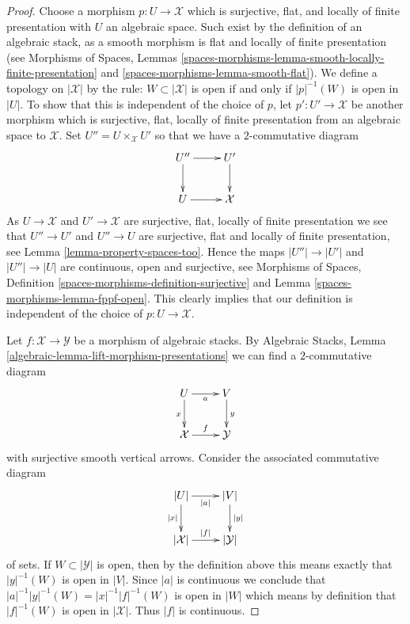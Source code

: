 \documentclass[10pt,a4paper]{amsart}
\theoremstyle{plain}
\theoremstyle{definition}
\theoremstyle{remark}
\numberwithin{equation}{subsection}
\begin{document}
\begin{proof}
Choose a morphism $p : U \to \mathcal{X}$ which is
surjective, flat, and locally of finite presentation
with $U$ an algebraic space. Such exist by the definition of an algebraic
stack, as a smooth morphism is flat and locally of finite presentation
(see
Morphisms of Spaces,
Lemmas \ref{spaces-morphisms-lemma-smooth-locally-finite-presentation} and
\ref{spaces-morphisms-lemma-smooth-flat}).
We define a topology on $|\mathcal{X}|$ by the rule:
$W \subset |\mathcal{X}|$ is open if and only if $|p|^{-1}(W)$ is open
in $|U|$. To show that this is independent of the choice of $p$, let
$p' : U' \to \mathcal{X}$ be another morphism which is surjective, flat,
locally of finite presentation from an algebraic space to
$\mathcal{X}$. Set $U'' = U \times_\mathcal{X} U'$
so that we have a $2$-commutative diagram
$$
\xymatrix{
U'' \ar[r] \ar[d] & U' \ar[d] \\
U \ar[r] & \mathcal{X}
}
$$
As $U \to \mathcal{X}$ and $U' \to \mathcal{X}$ are surjective, flat,
locally of finite presentation we see that $U'' \to U'$ and $U'' \to U$
are surjective, flat and locally of finite presentation, see
Lemma \ref{lemma-property-spaces-too}.
Hence the maps $|U''| \to |U'|$ and $|U''| \to |U|$ are continuous, open
and surjective, see
Morphisms of Spaces,
Definition \ref{spaces-morphisms-definition-surjective} and
Lemma \ref{spaces-morphisms-lemma-fppf-open}.
This clearly implies that our definition is independent of the choice
of $p : U \to \mathcal{X}$.

\medskip\noindent
Let $f : \mathcal{X} \to \mathcal{Y}$ be a morphism of algebraic stacks.
By
Algebraic Stacks, Lemma \ref{algebraic-lemma-lift-morphism-presentations}
we can find a $2$-commutative diagram
$$
\xymatrix{
U \ar[d]_x \ar[r]_a & V \ar[d]^y \\
\mathcal{X} \ar[r]^f & \mathcal{Y}
}
$$
with surjective smooth vertical arrows.
Consider the associated commutative diagram
$$
\xymatrix{
|U| \ar[d]_{|x|} \ar[r]_{|a|} & |V| \ar[d]^{|y|} \\
|\mathcal{X}| \ar[r]^{|f|} & |\mathcal{Y}|
}
$$
of sets. If $W \subset |\mathcal{Y}|$ is open, then by the definition
above this means exactly that $|y|^{-1}(W)$ is open in $|V|$. Since
$|a|$ is continuous we conclude that
$|a|^{-1}|y|^{-1}(W) = |x|^{-1}|f|^{-1}(W)$ is open in $|W|$ which means
by definition that $|f|^{-1}(W)$ is open in $|\mathcal{X}|$.
Thus $|f|$ is continuous.


\end{proof}
\end{document}
